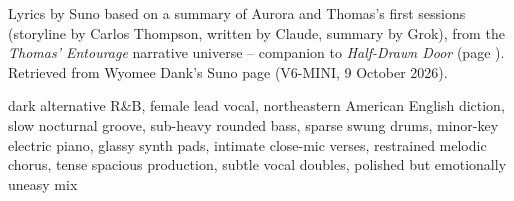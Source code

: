 
\begin{notes}
Lyrics by Suno based on a summary of Aurora and Thomas's first sessions (storyline by Carlos Thompson, written by Claude, summary by Grok), from the \emph{Thomas' Entourage} narrative universe -- companion to \emph{Half-Drawn Door} (page \pageref{sec:half-drawn-door}). Retrieved from Wyomee Dank's Suno page (V6-MINI, 9 October 2026).
\end{notes}
\begin{style}
dark alternative R\&B, female lead vocal, northeastern American English diction, slow nocturnal groove, sub-heavy rounded bass, sparse swung drums, minor-key electric piano, glassy synth pads, intimate close-mic verses, restrained melodic chorus, tense spacious production, subtle vocal doubles, polished but emotionally uneasy mix
\end{style}

